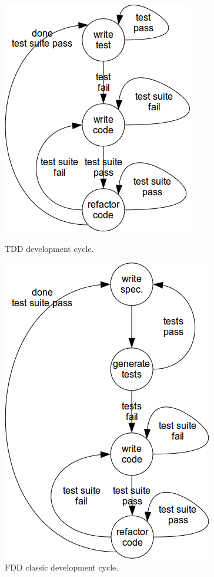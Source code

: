 \documentclass{article}
\begin{document}
\begin{figure}[ht]
  \begin{minipage}[b]{0.49\linewidth}
    \centering
    \includegraphics[scale=0.5]{diagrams/TDD_classic}
    \caption{TDD development cycle.}
    \label{fig:tdd_diagram}
  \end{minipage}
  \hspace{0.02\linewidth}
  \begin{minipage}[b]{0.49\linewidth}
    \centering
    \includegraphics[scale=0.5]{diagrams/FDD_classic}
    \caption{FDD classic development cycle.}
    \label{fig:fdd_diagram}
  \end{minipage}
\end{figure}
\end{document}
